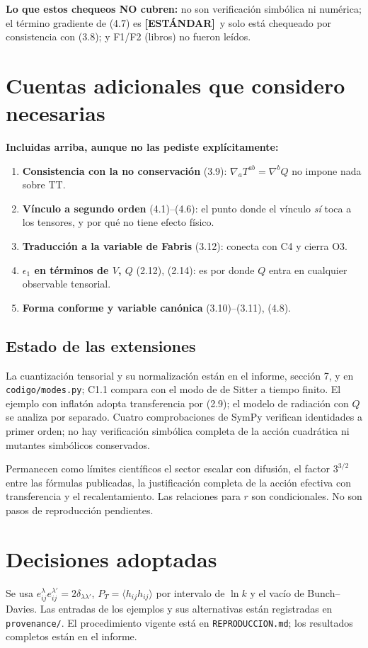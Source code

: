 \documentclass[11pt,a4paper]{article}
\newcommand{\estandar}{{\bfseries\color{BurntOrange}[ESTÁNDAR]}}
\begin{document}
\textbf{Lo que estos chequeos NO cubren:} no son verificación simbólica ni numérica; el término gradiente de (4.7) es \estandar\ y solo está chequeado por consistencia con (3.8); y F1/F2 (libros) no fueron leídos.

\section{Cuentas adicionales que considero necesarias}\label{sec:pend}

\textbf{Incluidas arriba, aunque no las pediste explícitamente:}
\begin{enumerate}[nosep]
\item \textbf{Consistencia con la no conservación} (3.9): $\nabla_aT^{ab}=\nabla^bQ$ no impone nada sobre TT.
\item \textbf{Vínculo a segundo orden} (4.1)--(4.6): el punto donde el vínculo \emph{sí} toca a los tensores, y por qué no tiene efecto físico.
\item \textbf{Traducción a la variable de Fabris} (3.12): conecta con C4 y cierra O3.
\item \textbf{$\epsilon_1$ en términos de $V$, $Q$} (2.12), (2.14): es por donde $Q$ entra en cualquier observable tensorial.
\item \textbf{Forma conforme y variable canónica} (3.10)--(3.11), (4.8).
\end{enumerate}

\subsection*{Estado de las extensiones}
La cuantización tensorial y su normalización están en el informe, sección 7,
y en \texttt{codigo/modes.py}; C1.1 compara con el modo de de Sitter a tiempo finito.
El ejemplo con inflatón adopta transferencia por (2.9); el modelo de radiación
con $Q$ se analiza por separado. Cuatro comprobaciones de SymPy verifican
identidades a primer orden; no hay verificación simbólica completa de la acción
cuadrática ni mutantes simbólicos conservados.

Permanecen como límites científicos el sector escalar con difusión, el factor
$3^{3/2}$ entre las fórmulas publicadas, la justificación completa de la acción
efectiva con transferencia y el recalentamiento. Las relaciones para $r$ son
condicionales. No son pasos de reproducción pendientes.

\section{Decisiones adoptadas}\label{sec:dec}
Se usa $e^\lambda_{ij}e^{\lambda'}_{ij}=2\delta_{\lambda\lambda'}$,
$P_T=\langle h_{ij}h_{ij}\rangle$ por intervalo de $\ln k$ y el vacío
de Bunch--Davies. Las entradas de los ejemplos y sus alternativas están
registradas en \texttt{provenance/}. El procedimiento vigente está en
\texttt{REPRODUCCION.md}; los resultados completos están en el informe.
\end{document}
